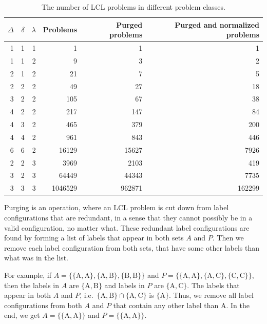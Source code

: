 \begin{table}[H]
  \centering
  \begin{tabular}{rrrrrr}
    \toprule
    $\Delta$ & $\delta$ & $\lambda$ & Problems & Purged problems & Purged and normalized problems\\
    \midrule
    1 & 1 & 1 & 1 & 1 & 1 \\
    \midrule
    1 & 1 & 2 & 9 & 3 & 2 \\
    2 & 1 & 2 & 21 & 7 & 5 \\
    2 & 2 & 2 & 49 & 27 & 18 \\
    3 & 2 & 2 & 105 & 67 & 38 \\
    4 & 2 & 2 & 217 & 147 & 84 \\
    4 & 3 & 2 & 465 & 379 & 200 \\
    4 & 4 & 2 & 961 & 843 & 446 \\
    6 & 6 & 2 & 16129 & 15627 & 7926 \\
    \midrule
    2 & 2 & 3 & 3969 & 2103 & 419 \\
    3 & 2 & 3 & 64449 & 44343 & 7735 \\
    3 & 3 & 3 & 1046529 & 962871 & 162299 \\
    \bottomrule
  \end{tabular}
  \caption{%
    The number of LCL problems in different problem classes.
  }
  \label{tbl:lcl_problem_classes}
\end{table}

Purging is an operation, where an LCL problem is cut down from label configurations that are redundant, in a sense that they cannot possibly be in a valid configuration, no matter what.
These redundant label configurations are found by forming a list of labels that appear in both sets $A$ and $P$.
Then we remove each label configuration from both sets, that have some other labels than what was in the list.

For example, if $A=\{\{\mathrm{A, A}\}, \{\mathrm{A, B}\}, \{\mathrm{B, B}\}\}$ and $P=\{\{\mathrm{A, A}\}, \{\mathrm{A, C}\}, \{\mathrm{C, C}\}\}$, then the labels in $A$ are $\{\mathrm{A, B}\}$ and labels in $P$ are $\{\mathrm{A, C}\}$.
The labels that appear in both $A$ and $P$, i.e.\ $\{\mathrm{A, B}\} \cap \{\mathrm{A, C}\} $ is $\{\mathrm{A}\}$.
Thus, we remove all label configurations from both $A$ and $P$ that contain any other label than $\mathrm{A}$.
In the end, we get $A=\{\{\mathrm{A, A}\}\}$ and $P=\{\{\mathrm{A, A}\}\}$.


